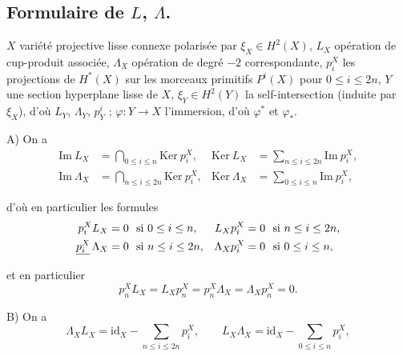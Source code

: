 \documentclass[11pt,a4paper]{article}
\begin{document}
\subsection*{Formulaire de $L$, $\Lambda$.}

$X$ variété projective lisse connexe polarisée par $\xi_{X} \in H^{2}(X)$,
$L_{X}$ opération de cup-produit associée, $\Lambda_{X}$ opération de degré
$-2$ correspondante, $p^{X}_{i}$ les projections de $H^{*}(X)$ sur les
morceaux primitifs $P^{i}(X)$ pour $0 \le i \le 2n$, $Y$ une section
hyperplane lisse de $X$, $\xi_{Y} \in H^{2}(Y)$ la self-intersection (induite
par $\xi_{X}$), d'où $L_{Y}$, $\Lambda_{Y}$, $p^{i}_{Y}$ ;
$\varphi : Y \to X$ l'immersion, d'où $\varphi^{*}$ et $\varphi_{*}$.

A) \quad On a
\begin{align}
\mathrm{Im}\ L_{X} &= \bigcap_{0 \le i \le n} \mathrm{Ker}\ p^{X}_{i}, &
\mathrm{Ker}\ L_{X} &= \sum_{n \le i \le 2n} \mathrm{Im}\ p^{X}_{i}, \\
\mathrm{Im}\ \Lambda_{X} &= \bigcap_{n \le i \le 2n} \mathrm{Ker}\ p^{X}_{i}, &
\mathrm{Ker}\ \Lambda_{X} &= \sum_{0 \le i \le n} \mathrm{Im}\ p^{X}_{i},
\end{align}

d'où en particulier les formules
\begin{align}
p^{X}_{i} L_{X} &= 0 \ \text{ si } 0 \le i \le n, &
L_{X} p^{X}_{i} &= 0 \ \text{ si } n \le i \le 2n, \\
\uncertain{p^{X}_{i}}\, \Lambda_{X} &= 0 \ \text{ si } n \le i \le 2n, &
\Lambda_{X} p^{X}_{i} &= 0 \ \text{ si } 0 \le i \le n,
\end{align}

et en particulier
\begin{equation}
p^{X}_{n} L_{X} = L_{X} p^{X}_{n} = p^{X}_{n} \Lambda_{X} = \Lambda_{X} p^{X}_{n} = 0 .
\end{equation}


B) \quad On a
\begin{equation}
\Lambda_{X} L_{X} = \mathrm{id}_{X} - \sum_{n \le i \le 2n} p^{X}_{i}, \qquad
L_{X} \Lambda_{X} = \mathrm{id}_{X} - \sum_{0 \le i \le n} p^{X}_{i},
\end{equation}

\end{document}
